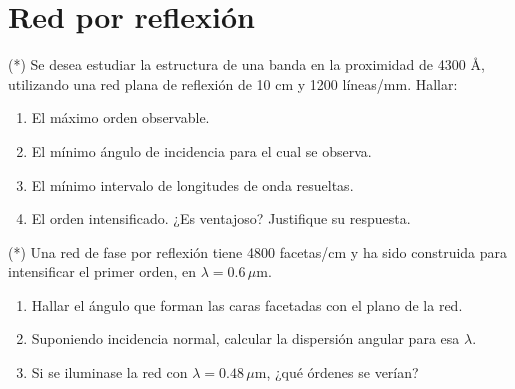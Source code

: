 \section*{Red por reflexión}

\item (*) Se desea estudiar la estructura de una banda en la proximidad de 4300 Å, utilizando una red plana de reflexión de 10 cm y 1200 líneas/mm.
Hallar:
\begin{enumerate}
\item El máximo orden observable. 
\item El mínimo ángulo de incidencia para el cual se observa. 
\item El mínimo intervalo de longitudes de onda resueltas. 
\item El orden intensificado. ¿Es ventajoso? Justifique su respuesta. 
\end{enumerate}


\item (*) Una red de fase por reflexión tiene 4800 facetas/cm y ha sido construida
para intensificar el primer orden, en $\lambda=0.6\,\mu$m. 
\begin{enumerate}
	\item Hallar el ángulo que forman las caras facetadas con el plano de la red. 
	\item Suponiendo incidencia normal, calcular la dispersión angular para esa $\lambda$. 
	\item Si se iluminase la red con $\lambda=0.48\,\mu$m, ¿qué órdenes se verían?
\end{enumerate}
